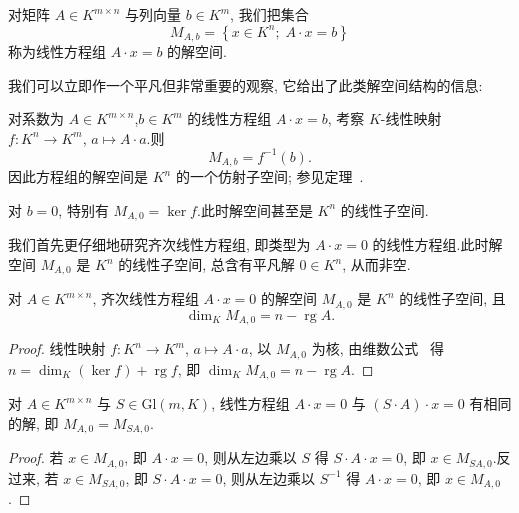 \begin{definition}[解空间]\label{def:3.5.1}
对矩阵 $A \in K^{m \times n}$ 与列向量 $b \in K^m$, 我们把集合
\[
M_{A, b} = \left\{x \in K^n;\; A \cdot x = b\right\}
\]
称为线性方程组 $A \cdot x = b$ 的解空间.
\end{definition}

我们可以立即作一个平凡但非常重要的观察, 它给出了此类解空间结构的信息:

\begin{remark}\label{rem:3.5.2}
对系数为 $A \in K^{m \times n}$,$b \in K^m$ 的线性方程组 $A \cdot x = b$, 考察 $K$-线性映射 $f \colon K^n \longrightarrow K^m$, $a \longmapsto A \cdot a$.则
\[
M_{A, b} = f^{-1}(b)\text{.}
\]
因此方程组的解空间是 $K^n$ 的一个仿射子空间; 参见定理~.
\end{remark}

对 $b = 0$, 特别有 $M_{A, 0} = \ker f$.此时解空间甚至是 $K^n$ 的线性子空间.

我们首先更仔细地研究齐次线性方程组, 即类型为 $A \cdot x = 0$ 的线性方程组.此时解空间 $M_{A, 0}$ 是 $K^n$ 的线性子空间, 总含有平凡解 $0 \in K^n$, 从而非空.

\begin{theorem}\label{thm:3.5.3}
对 $A \in K^{m \times n}$, 齐次线性方程组 $A \cdot x = 0$ 的解空间 $M_{A, 0}$ 是 $K^n$ 的线性子空间, 且
\[
\dim_K M_{A, 0} = n - \operatorname{rg} A\text{.}
\]
\end{theorem}

\begin{proof}
线性映射 $f \colon K^n \longrightarrow K^m$, $a \longmapsto A \cdot a$, 以 $M_{A, 0}$ 为核, 由维数公式~ 得 $n = \dim_K(\ker f) + \operatorname{rg} f$, 即 $\dim_K M_{A, 0} = n - \operatorname{rg} A$.
\end{proof}

\begin{lemma}\label{lem:3.5.4}
对 $A \in K^{m \times n}$ 与 $S \in \mathrm{Gl}(m, K)$, 线性方程组 $A \cdot x = 0$ 与 $(S \cdot A) \cdot x = 0$ 有相同的解, 即 $M_{A, 0} = M_{SA, 0}$.
\end{lemma}

\begin{proof}
若 $x \in M_{A, 0}$, 即 $A \cdot x = 0$, 则从左边乘以 $S$ 得 $S \cdot A \cdot x = 0$, 即 $x \in M_{SA, 0}$.反过来, 若 $x \in M_{SA, 0}$, 即 $S \cdot A \cdot x = 0$, 则从左边乘以 $S^{-1}$ 得 $A \cdot x = 0$, 即 $x \in M_{A, 0}$.
\end{proof}

